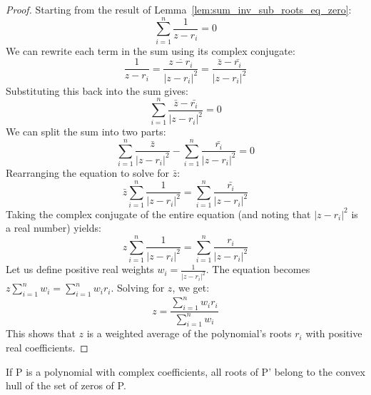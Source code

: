 \begin{proof}
  Starting from the result of Lemma~\ref{lem:sum_inv_sub_roots_eq_zero}:
  $$ \sum_{i=1}^{n} \frac{1}{z - r_i} = 0 $$
  We can rewrite each term in the sum using its complex conjugate:
  $$ \frac{1}{z - r_i} = \frac{\overline{z - r_i}}{|z - r_i|^2} = \frac{\bar{z} - \bar{r_i}}{|z - r_i|^2} $$
  Substituting this back into the sum gives:
  $$ \sum_{i=1}^{n} \frac{\bar{z} - \bar{r_i}}{|z - r_i|^2} = 0 $$
  We can split the sum into two parts:
  $$ \sum_{i=1}^{n} \frac{\bar{z}}{|z - r_i|^2} - \sum_{i=1}^{n} \frac{\bar{r_i}}{|z - r_i|^2} = 0 $$
  Rearranging the equation to solve for $\bar{z}$:
  $$ \bar{z} \sum_{i=1}^{n} \frac{1}{|z - r_i|^2} = \sum_{i=1}^{n} \frac{\bar{r_i}}{|z - r_i|^2} $$
  Taking the complex conjugate of the entire equation (and noting that $|z - r_i|^2$ is a real number) yields:
  $$ z \sum_{i=1}^{n} \frac{1}{|z - r_i|^2} = \sum_{i=1}^{n} \frac{r_i}{|z - r_i|^2} $$
  Let us define positive real weights $w_i = \frac{1}{|z - r_i|^2}$. The equation becomes $z \sum_{i=1}^{n} w_i = \sum_{i=1}^{n} w_i r_i$.
  Solving for $z$, we get:
  $$ z = \frac{\sum_{i=1}^{n} w_i r_i}{\sum_{i=1}^{n} w_i} $$
  This shows that $z$ is a weighted average of the polynomial's roots $r_i$ with positive real coefficients.
\end{proof}

\begin{theorem}
  \label{thm:gauss_lucas}
  \leanok
  If P is a polynomial with complex coefficients, all roots of P' belong to the convex hull of the set of zeros of P.
\end{theorem}

